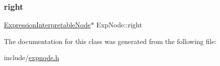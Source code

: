 \mbox{\label{classExpNode_af298caffdc70c8f20095af1191e801cd}} 
\subsubsection{\texorpdfstring{right}{right}}
{\footnotesize\ttfamily \hyperlink{classExpressionInterpretableNode}{Expression\+Interpretable\+Node}$\ast$ Exp\+Node\+::right}



The documentation for this class was generated from the following file\+:\begin{DoxyCompactItemize}
\item 
include/\hyperlink{expnode_8h}{expnode.\+h}\end{DoxyCompactItemize}
